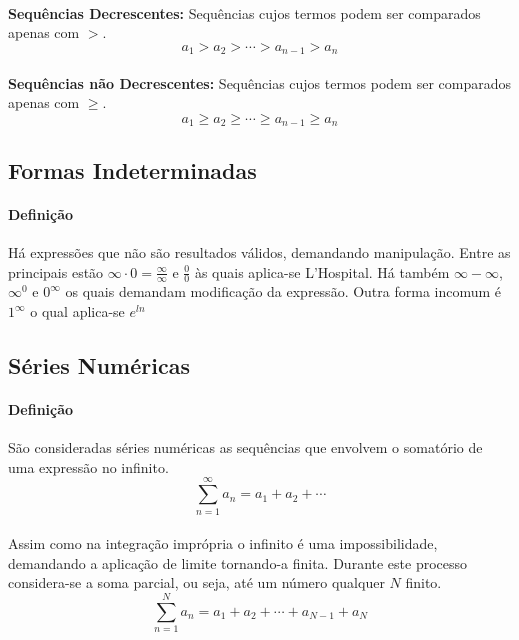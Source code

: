 \documentclass{article}
\begin{document}
            \paragraph{}\textbf{Sequências Decrescentes:} Sequências cujos termos podem ser comparados apenas com $>$.
                \begin{equation}
                    a_1>a_2>\cdots>a_{n-1}>a_n
                \end{equation}
            \paragraph{}\textbf{Sequências não Decrescentes:} Sequências cujos termos podem ser comparados apenas com $\ge$.
                \begin{equation}
                    a_1\ge a_2\ge \cdots \ge a_{n-1} \ge a_n
                \end{equation}
                
        \subsection{Formas Indeterminadas}
            \paragraph{Definição}Há expressões que não são resultados válidos, demandando manipulação. Entre as principais estão $\infty\cdot0=\frac{\infty}{\infty}$ e $\frac{0}{0}$ às quais aplica-se L'Hospital. Há também $\infty-\infty$, $\infty^0$ e $0^{\infty}$ os quais demandam modificação da expressão. Outra forma incomum é $1^{\infty}$ o qual aplica-se $e^{ln}$
        
        \subsection{Séries Numéricas}
            \paragraph{Definição}São consideradas séries numéricas as sequências que envolvem o somatório de uma expressão no infinito.
            \begin{equation}
                \sum\limits_{n=1}^{\infty}a_n = a_1 + a_2 + \cdots
            \end{equation}
            \paragraph{}Assim como na integração imprópria o infinito é uma impossibilidade, demandando a aplicação de limite tornando-a finita. Durante este processo considera-se a soma parcial, ou seja, até um número qualquer $N$ finito.
            \begin{equation}
                \sum\limits_{n=1}^{N}a_n = a_1 + a_2 + \cdots + a_{N-1} + a_N
            \end{equation}
\end{document}
